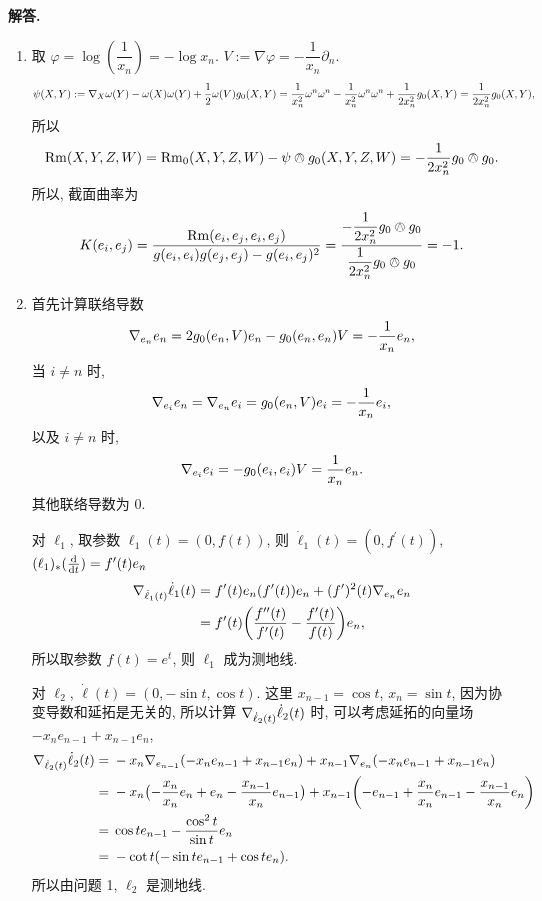 \documentclass{ctexart}
\newenvironment{solution}{\par\noindent\textbf{解答. }}{\par}
\begin{document}
\begin{solution}
    \begin{enumerate}
        \item 取 $\varphi = \log (\dfrac{1}{x_n}) = -\log x_n$. $V := \nabla \varphi = -\dfrac{1}{x_n} \partial_{n}$.
        \[
            \psi(X, Y) := \nabla_{X}\omega(Y) - \omega(X)\omega(Y) + \dfrac{1}{2}\omega(V)g_0(X, Y) = \dfrac{1}{x_n^2}\omega^n\omega^n - \dfrac{1}{x_n^2}\omega^n\omega^n + \dfrac{1}{2x_n^2}g_0(X, Y) = \dfrac{1}{2x_n^2}g_0(X, Y),
        \]
        所以
        \[
            \mathrm{Rm}(X, Y, Z, W) = \mathrm{Rm}_0(X, Y, Z, W) - \psi \owedge g_0(X, Y, Z, W) = -\dfrac{1}{2x_n^2}g_0 \owedge g_0.
        \]
        所以, 截面曲率为
        \[
            K(e_i, e_j) = \dfrac{\mathrm{Rm}(e_i, e_j, e_i, e_j)}{g(e_i, e_i)g(e_j, e_j) - g(e_i, e_j)^2} = \dfrac{-\dfrac{1}{2x_n^2}g_0 \owedge g_0}{\dfrac{1}{2x_n^2}g_0 \owedge g_0} = -1.
        \]
        \item 首先计算联络导数
        \[
            \nabla_{e_n}e_n = 2g_0(e_n, V)e_n - g_0(e_n, e_n)V = -\dfrac{1}{x_n}e_n,
        \]
        当 $ i \not= n$ 时,
        \[
            \nabla_{e_i}e_n = \nabla_{e_n}e_i = g_0(e_n, V)e_i = -\dfrac{1}{x_n}e_i,
        \]
        以及 $ i \not= n$ 时,
        \[
            \nabla_{e_i}e_i = -g_0(e_i, e_i)V = \dfrac{1}{x_n}e_n.
        \]
        其他联络导数为 $0$.

        \newcommand{\dell}{\dot{\ell}}
        对 $\ell_1$, 取参数 $\ell_1(t) = (0, f(t))$, 则 $\dell_1(t) = (0, f^\prime(t))$, $(\ell_1)_{\ast}(\frac{\mathop{}\!\mathrm{d}}{\mathop{}\!\mathrm{d} t}) = f^{\prime}(t)e_n$
        \[
            \begin{aligned}
            \Div{\dell_1(t)}\dell_1(t) ={} & f^{\prime}(t)e_n(f^{\prime}(t))e_n + (f^{\prime})^2(t)\Div{e_n}{e_n} \\
            ={} & f^{\prime}(t)\biggl(\dfrac{f^{\prime\prime}(t)}{f^{\prime}(t)} - \dfrac{f^{\prime}(t)}{f(t)}\biggr)e_n,
            \end{aligned}
        \]
        所以取参数 $f(t) = e^t$, 则 $\ell_1$ 成为测地线.

        对 $\ell_2$, $\dell(t) = (0, -\sin t, \cos t)$. 这里 $x_{n - 1} = \cos t$, $x_{n} = \sin t$, 因为协变导数和延拓是无关的, 所以计算 $\Div{\dell_2(t)}\dell_2(t)$ 时, 可以考虑延拓的向量场 $-x_{n}e_{n - 1} + x_{n - 1}e_{n}$,
        \[
            \begin{aligned}
                \Div{\dell_2(t)}\dell_2(t) ={} & -x_n \Div{e_{n - 1}}(-x_n e_{n - 1} + x_{n - 1} e_n) + x_{n - 1} \Div{e_{n}}(-x_{n} e_{n - 1} + x_{n - 1} e_n) \\
                ={} & -x_n \bigl(-\dfrac{x_n}{x_n}e_{n} + e_n - \dfrac{x_{n - 1}}{x_n}e_{n - 1} \bigr) + x_{n - 1} \biggl( -e_{n - 1} + \dfrac{x_n}{x_n}e_{n - 1} - \dfrac{x_{n - 1}}{x_n}e_n  \biggr) \\
                ={} & \cos t e_{n - 1} - \dfrac{\cos^2 t }{\sin t}e_n \\
                ={} & -\cot t(-\sin t e_{n - 1} + \cos t e_n).
            \end{aligned}
        \]
        所以由问题 1, $\ell_2$ 是测地线.
    \end{enumerate}
\end{solution}
\end{document}
